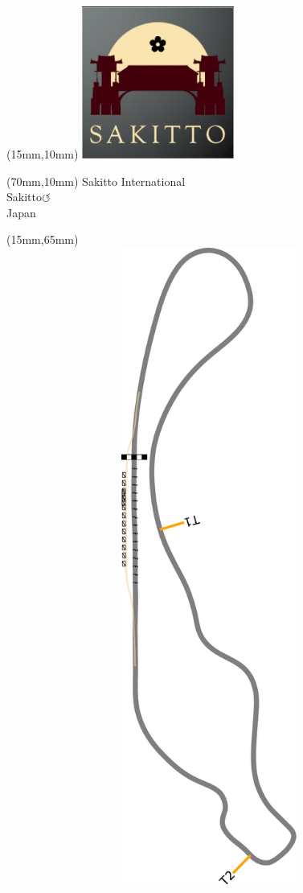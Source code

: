 \null\newpage
\begin{textblock*}{50mm}(15mm,10mm)%
\includegraphics[width=50mm]{LG/2015-05-20_00093.png}
\end{textblock*}
\begin{textblock*}{130mm}(70mm,10mm)%
{\fontsize{20}{20}\selectfont Sakitto International\\}
{\fontsize{16}{16}\selectfont Sakitto\hfill \huge$\circlearrowleft$\\}
{\fontsize{12}{12}\selectfont Japan\\}
\end{textblock*}
\begin{textblock*}{185mm}(15mm,65mm)%
\centering
\mbox{\includegraphics[width=185mm,height=210mm,keepaspectratio]{PT/SAIN.pdf}}
\end{textblock*}
